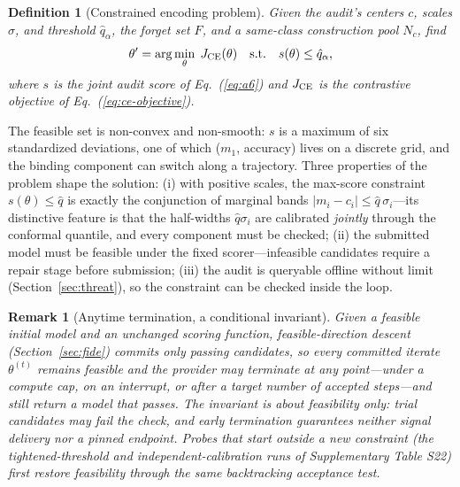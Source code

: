 \documentclass[lettersize,journal]{IEEEtran}
\newtheorem{definition}{Definition}
\newtheorem{remark}{Remark}
\begin{document}
\begin{definition}[Constrained encoding problem]
\label{def:encoding}
Given the audit's centers $c$, scales $\sigma$, and threshold
$\hat q_{\alpha}$, the forget set $F$, and a same-class
construction pool $N_c$, find
\begin{equation}
\label{eq:encoding}
\theta' = \arg\min_{\theta}\; J_{\rm CE}(\theta)
\quad\mathrm{s.t.}\quad s(\theta) \le \hat q_{\alpha},
\end{equation}
where $s$ is the joint audit score of Eq.~(\ref{eq:a6}) and
$J_{\rm CE}$ is the contrastive objective of
Eq.~(\ref{eq:ce-objective}).
\end{definition}

The feasible set is non-convex and non-smooth: $s$ is a maximum
of six standardized deviations, one of which ($m_1$, accuracy)
lives on a discrete grid, and the binding component can switch
along a trajectory. Three properties of the problem shape the
solution: (i) with positive scales, the max-score constraint
$s(\theta) \le \hat q$ is exactly the conjunction of marginal
bands $|m_i - c_i| \le \hat q\,\sigma_i$---its distinctive
feature is that the half-widths $\hat q\sigma_i$ are calibrated
\emph{jointly} through the conformal quantile, and every
component must be checked; (ii) the submitted model must
be feasible under the fixed scorer---infeasible candidates
require a repair stage before submission; (iii) the audit is
queryable offline without limit (Section~\ref{sec:threat}), so
the constraint can be checked inside the loop.

\begin{remark}[Anytime termination, a conditional invariant]
\label{rem:anytime}
Given a feasible initial model and an unchanged scoring
function, feasible-direction descent
(Section~\ref{sec:fide}) commits only passing candidates, so
every committed iterate $\theta^{(t)}$ remains feasible and the
provider may terminate at any point---under a compute cap,
on an interrupt, or after a target number of accepted
steps---and still return a model that passes. The invariant
is about feasibility only: trial candidates may fail the
check, and early termination guarantees neither signal
delivery nor a pinned endpoint. Probes that start outside a
new constraint (the tightened-threshold and
independent-calibration runs of Supplementary Table S22)
first restore feasibility through the same backtracking
acceptance test.
\end{remark}
\end{document}
